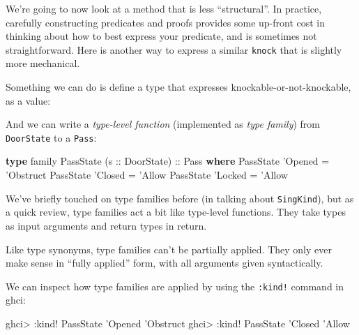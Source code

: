 \documentclass[]{article}
\newenvironment{Shaded}{}{}
\newcommand{\DataTypeTok}[1]{\textcolor[rgb]{0.56,0.13,0.00}{#1}}
\newcommand{\FunctionTok}[1]{\textcolor[rgb]{0.02,0.16,0.49}{#1}}
\newcommand{\KeywordTok}[1]{\textcolor[rgb]{0.00,0.44,0.13}{\textbf{#1}}}
\newcommand{\NormalTok}[1]{#1}
\newcommand{\OtherTok}[1]{\textcolor[rgb]{0.00,0.44,0.13}{#1}}
\begin{document}
We're going to now look at a method that is less ``structural''. In practice,
carefully constructing predicates and proofs provides some up-front cost in
thinking about how to best express your predicate, and is sometimes not
straightforward. Here is another way to express a similar \texttt{knock} that is
slightly more mechanical.

Something we can do is define a type that expresses knockable-or-not-knockable,
as a value:

\begin{Shaded}
\end{Shaded}

And we can write a \emph{type-level function} (implemented as \emph{type
family}) from \texttt{DoorState} to a \texttt{Pass}:

\begin{Shaded}
\begin{Highlighting}[]
\KeywordTok{type}\NormalTok{ family }\DataTypeTok{PassState}\NormalTok{ (}\OtherTok{s ::} \DataTypeTok{DoorState}\NormalTok{)}\OtherTok{ ::} \DataTypeTok{Pass} \KeywordTok{where}
    \DataTypeTok{PassState}\NormalTok{ '}\DataTypeTok{Opened} \FunctionTok{=}\NormalTok{ '}\DataTypeTok{Obstruct}
    \DataTypeTok{PassState}\NormalTok{ '}\DataTypeTok{Closed} \FunctionTok{=}\NormalTok{ '}\DataTypeTok{Allow}
    \DataTypeTok{PassState}\NormalTok{ '}\DataTypeTok{Locked} \FunctionTok{=}\NormalTok{ '}\DataTypeTok{Allow}
\end{Highlighting}
\end{Shaded}

We've briefly touched on type families before (in talking about
\texttt{SingKind}), but as a quick review, type families act a bit like
type-level functions. They take types as input arguments and return types in
return.

Like type synonyms, type families can't be partially applied. They only ever
make sense in ``fully applied'' form, with all arguments given syntactically.

We can inspect how type families are applied by using the \texttt{:kind!}
command in ghci:

\begin{Shaded}
\begin{Highlighting}[]
\NormalTok{ghci}\FunctionTok{>} \FunctionTok{:}\NormalTok{kind}\FunctionTok{!} \DataTypeTok{PassState}\NormalTok{ '}\DataTypeTok{Opened}
\NormalTok{'}\DataTypeTok{Obstruct}
\NormalTok{ghci}\FunctionTok{>} \FunctionTok{:}\NormalTok{kind}\FunctionTok{!} \DataTypeTok{PassState}\NormalTok{ '}\DataTypeTok{Closed}
\NormalTok{'}\DataTypeTok{Allow}
\end{Highlighting}
\end{Shaded}
\end{document}
